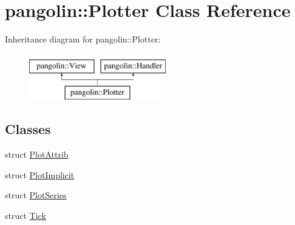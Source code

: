 \hypertarget{classpangolin_1_1_plotter}{}\section{pangolin\+:\+:Plotter Class Reference}
\label{classpangolin_1_1_plotter}
Inheritance diagram for pangolin\+:\+:Plotter\+:\begin{figure}[H]
\begin{center}
\leavevmode
\includegraphics[height=2.000000cm]{classpangolin_1_1_plotter}
\end{center}
\end{figure}
\subsection*{Classes}
\begin{DoxyCompactItemize}
\item 
struct \hyperlink{structpangolin_1_1_plotter_1_1_plot_attrib}{Plot\+Attrib}
\item 
struct \hyperlink{structpangolin_1_1_plotter_1_1_plot_implicit}{Plot\+Implicit}
\item 
struct \hyperlink{structpangolin_1_1_plotter_1_1_plot_series}{Plot\+Series}
\item 
struct \hyperlink{structpangolin_1_1_plotter_1_1_tick}{Tick}
\end{DoxyCompactItemize}
